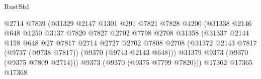 \begin{lexlean}{RustStd}
\begin{coremodule}
                                                @2714
                                                @7839
                                                (@31329
                                                  @2147
                                                  @1301
                                                  @291
                                                  @7821
                                                  @7828
                                                  @4200
                                                  (@31338
                                                    @2146
                                                    @648
                                                    @1250
                                                    @3137
                                                    @7820
                                                    @7827
                                                    @2702
                                                    @7798
                                                    @2708
                                                    @31358
                                                    (@31337
                                                      @2144
                                                      @158
                                                      @648
                                                      @27
                                                      @7817
                                                      @2714
                                                      @2727
                                                      @2702
                                                      @7808
                                                      @2708
                                                      (@31372
                                                        @2143
                                                        @7817
                                                        (@9737 (@9738 @7817))
                                                        (@9370 (@9743 @2143 @648)))
                                                      @31379
                                                      @9373
                                                      (@9370 (@9375 @7809 @2714)))
                                                    @9373
                                                    (@9370 (@9375 @7799 @7820)))
                                                  @17362
                                                  @17365
                                                  @17368

\end{coremodule}
\end{lexlean}
